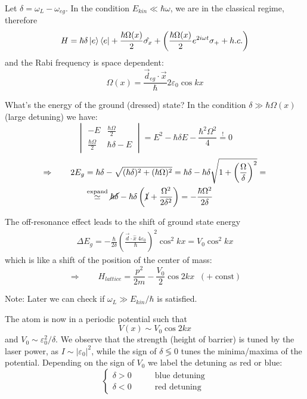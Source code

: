 Let $\delta=\omega_L-\omega_{eg}$. In the condition $E_{kin} \ll \hbar\omega$, we are in the classical regime, therefore
\begin{equation*}
    H = \hbar\delta\ket{e}\bra{e}
    + \frac{\hbar\Omega(x)}{2}\hat{\sigma_x}
    + \left(
        \frac{\hbar\Omega(x)}{2}e^{2i\omega t}
        \sigma_+ 
        + h.c.
    \right)
\end{equation*}
%
and the Rabi frequency is space dependent:
$$\Omega(x) = 
\frac{\vec{d}_{eg}\cdot\vec{x}}{\hbar} 
2\varepsilon_0\cos kx $$

What's the energy of the ground (dressed) state? In the condition $\delta \gg \hbar\Omega(x)$ (large detuning) we have:
\begin{equation*}
\begin{vmatrix}
    - E & \frac{\hbar\Omega}{2}\\
    \frac{\hbar\Omega}{2} & \hbar\delta - E
\end{vmatrix}
= E^2 -\hbar\delta E - \frac{\hbar^2\Omega^2}{4} 
\stackrel{!}{=} 0
\end{equation*}
\begin{align*}
\Rightarrow \qquad 2E_g & = \hbar\delta
    - \sqrt{(\hbar\delta)^2+(\hbar\Omega)^2}
 = \hbar\delta - \hbar\delta \sqrt{1+\left(\frac{\Omega}{\delta}\right)^2} =\\
 &\stackrel{\text{expand}}{\simeq}\cancel{\hbar\delta} - \hbar\delta
    \left( \cancel{1} + \frac{\Omega^2}{2\delta^2}
    \right) =
    - \frac{\hbar\Omega^2}{2\delta}
\end{align*}

The off-resonance effect leads to the shift of ground state energy
\begin{align*}
\Delta E_g = 
- \frac{\hbar}{2\delta}
    \left( \frac{\vec{d}\cdot\hat{x} \; 4\varepsilon_0}{\hbar} \right)^2
    \cos^2{kx} = V_0 \cos^2{kx}
\end{align*}
which is like a shift of the position of the center of mass:
\begin{equation*}
\Longrightarrow \qquad H_{lattice} =  \frac{p^2}{2m} -
    \frac{V_0}{2}\cos{2kx} \;\;
    (+\;\text{const}) 
\end{equation*}

\noindent Note: Later we can check if $\omega_L \gg E_{kin}/\hbar$ is satisfied.

\noindent The atom is now in a periodic potential such that $$V(x) \sim V_0 \cos{2kx}$$ and $V_0 \sim \varepsilon_0^2/\delta$. We observe that the strength (height of barrier) is tuned by the laser power, as $I\sim|\varepsilon_0|^2$, while the sign of $\delta \lessgtr 0$ tunes the minima/maxima of the potential. Depending on the sign of $V_0$ we label the detuning as red or blue:
%
\begin{equation*}
\begin{cases}
\delta > 0 \qquad& \text{blue detuning}\\
\delta < 0 \qquad& \text{red detuning}
\end{cases}
\end{equation*}

